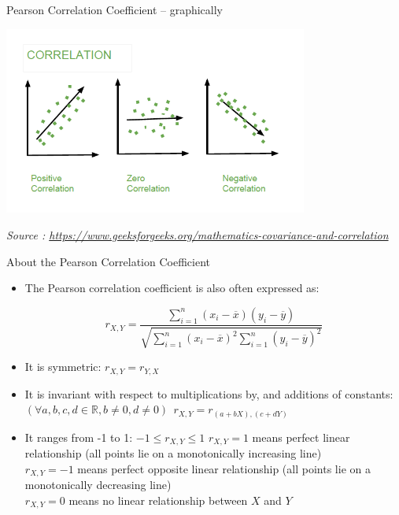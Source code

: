 \documentclass{beamer}
\begin{document}
\begin{frame}
{\centerline{Pearson Correlation Coefficient -- graphically}}


\begin{center}
\includegraphics[width=10cm]{A2022.IDSEPC.Correlazione/Correl.png}
\end{center} 
\textit{\small
Source : \url{https://www.geeksforgeeks.org/mathematics-covariance-and-correlation}}
\end{frame}


\begin{frame}
{\centerline{About the Pearson Correlation Coefficient}}

\begin{itemize}
\item The Pearson correlation coefficient is also often expressed as:

$$ r_{X,Y} = \frac{\sum_{i=1}^{n}(x_i-\overline{x})(y_i-\overline{y})}{\sqrt{\sum_{i=1}^{n}(x_i-\overline{x})^2\sum_{i=1}^{n}(y_i-\overline{y})^2}} $$
\item It is symmetric: $r_{X,Y} = r_{Y,X}$
\item It is invariant with respect to multiplications by, and additions of constants: $(\forall a, b, c, d \in \mathbb{R} , b \neq 0, d \neq 0)~~ r_{X,Y} = r_{(a + bX),(c + dY)} $
\item It ranges from -1 to 1: $-1 \leq r_{X,Y} \leq 1$
$ r_{X,Y}=1$ means perfect linear relationship (all points lie on a monotonically increasing line) \\
$ r_{X,Y}=-1$ means perfect opposite linear relationship (all points lie on a monotonically decreasing line)\\
$ r_{X,Y}= 0$ means no linear relationship between $X$ and $Y$
\end{itemize}


\end{frame}
\end{document}
